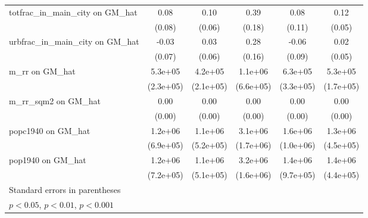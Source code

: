 \begin{table}[htbp]
\begin{tabular}{l*{5}{c}}
\addlinespace
totfrac\_in\_main\_city on GM\_hat&     0.08         &     0.10         &     0.39\sym{*}  &     0.08         &     0.12\sym{*}  \\
                &   (0.08)         &   (0.06)         &   (0.18)         &   (0.11)         &   (0.05)         \\
\addlinespace
urbfrac\_in\_main\_city on GM\_hat&    -0.03         &     0.03         &     0.28         &    -0.06         &     0.02         \\
                &   (0.07)         &   (0.06)         &   (0.16)         &   (0.09)         &   (0.05)         \\
\addlinespace
m\_rr on GM\_hat  &  5.3e+05\sym{*}  &  4.2e+05\sym{*}  &  1.1e+06         &  6.3e+05         &  5.3e+05\sym{**} \\
                &(2.3e+05)         &(2.1e+05)         &(6.6e+05)         &(3.3e+05)         &(1.7e+05)         \\
\addlinespace
m\_rr\_sqm2 on GM\_hat&     0.00         &     0.00         &     0.00         &     0.00         &     0.00\sym{*}  \\
                &   (0.00)         &   (0.00)         &   (0.00)         &   (0.00)         &   (0.00)         \\
\addlinespace
popc1940 on GM\_hat&  1.2e+06         &  1.1e+06\sym{*}  &  3.1e+06         &  1.6e+06         &  1.3e+06\sym{**} \\
                &(6.9e+05)         &(5.2e+05)         &(1.7e+06)         &(1.0e+06)         &(4.5e+05)         \\
\addlinespace
pop1940 on GM\_hat&  1.2e+06         &  1.1e+06\sym{*}  &  3.2e+06\sym{*}  &  1.4e+06         &  1.4e+06\sym{**} \\
                &(7.2e+05)         &(5.1e+05)         &(1.6e+06)         &(9.7e+05)         &(4.4e+05)         \\
\bottomrule
\multicolumn{6}{l}{\footnotesize Standard errors in parentheses}\\
\multicolumn{6}{l}{\footnotesize \sym{*} \(p<0.05\), \sym{**} \(p<0.01\), \sym{***} \(p<0.001\)}\\
\end{tabular}
\end{table}
